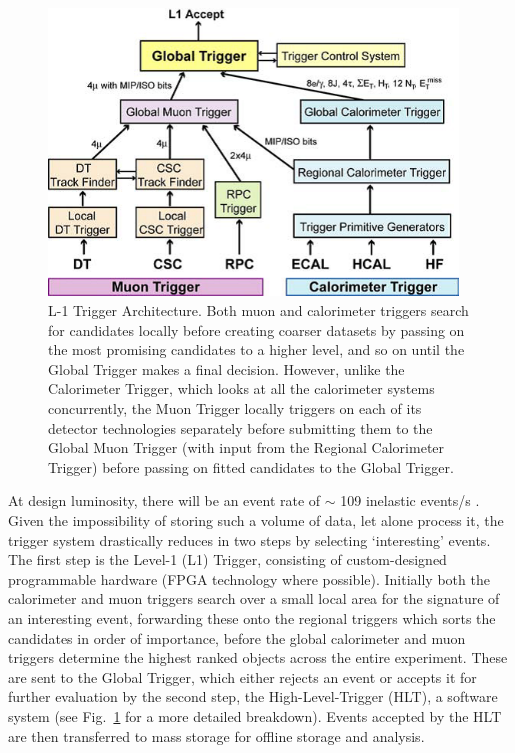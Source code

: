 \begin{figure}[htbp]
\begin{center}
\includegraphics[width=0.97\textwidth]{figs/cms/trigger.png}
\caption{L-1 Trigger Architecture. Both muon and calorimeter triggers search for candidates locally before creating coarser datasets by passing on the most promising candidates to a higher level, and so on until the Global Trigger makes a final decision. However, unlike the Calorimeter Trigger, which looks at all the calorimeter systems concurrently, the Muon Trigger locally triggers on each of its detector technologies separately before submitting them to the Global Muon Trigger (with input from the Regional Calorimeter Trigger) before passing on fitted candidates to the Global Trigger.}
\label{fig:trigger}
\end{center}
\end{figure}

At design luminosity, there will be an event rate of $\sim$ 109 inelastic events/s . Given the impossibility of storing such a volume of data, let alone process it, the trigger system drastically reduces in two steps by selecting `interesting' events. 
The first step is the Level-1 (L1) Trigger, consisting of custom-designed programmable hardware (FPGA technology where possible). 
Initially both the calorimeter and muon triggers search over a small local area for the signature of an interesting event, forwarding these onto the regional triggers which sorts the candidates in order of importance, before the global calorimeter and muon triggers determine the highest ranked objects across the entire experiment. 
These are sent to the Global Trigger, which either rejects an event or accepts it for further evaluation by the second step, the High-Level-Trigger (HLT), a software system (see Fig.~\ref{fig:trigger} for a more detailed breakdown). 
Events accepted by the HLT are then transferred to mass storage for offline storage and analysis\cite{oldcms}. 

